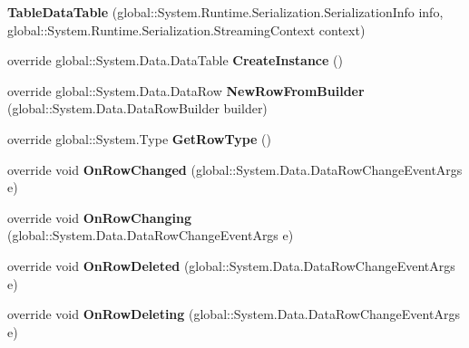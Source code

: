 \begin{DoxyCompactItemize}
\item 
\mbox{\label{classprojekt__grupowy_1_1database_data_set1_1_1_table_data_table_ac0995da5cb120357cb3af240467de6f1}} 
{\bfseries Table\+Data\+Table} (global\+::\+System.\+Runtime.\+Serialization.\+Serialization\+Info info, global\+::\+System.\+Runtime.\+Serialization.\+Streaming\+Context context)
\item 
\mbox{\label{classprojekt__grupowy_1_1database_data_set1_1_1_table_data_table_a4ffd6a51c1c4c0a27c8a012bc6db94a1}} 
override global\+::\+System.\+Data.\+Data\+Table {\bfseries Create\+Instance} ()
\item 
\mbox{\label{classprojekt__grupowy_1_1database_data_set1_1_1_table_data_table_a61b91c7eafce70ab6709152f96f77386}} 
override global\+::\+System.\+Data.\+Data\+Row {\bfseries New\+Row\+From\+Builder} (global\+::\+System.\+Data.\+Data\+Row\+Builder builder)
\item 
\mbox{\label{classprojekt__grupowy_1_1database_data_set1_1_1_table_data_table_a3cbf6074bb047e88fa88f6568589eb32}} 
override global\+::\+System.\+Type {\bfseries Get\+Row\+Type} ()
\item 
\mbox{\label{classprojekt__grupowy_1_1database_data_set1_1_1_table_data_table_aa4281e17997c8b233a81a69fc9261c2c}} 
override void {\bfseries On\+Row\+Changed} (global\+::\+System.\+Data.\+Data\+Row\+Change\+Event\+Args e)
\item 
\mbox{\label{classprojekt__grupowy_1_1database_data_set1_1_1_table_data_table_a02e53176dc2fcbb4a0bf31f99e1a4309}} 
override void {\bfseries On\+Row\+Changing} (global\+::\+System.\+Data.\+Data\+Row\+Change\+Event\+Args e)
\item 
\mbox{\label{classprojekt__grupowy_1_1database_data_set1_1_1_table_data_table_abbe092066f472ddabc2eb44f3ffd666b}} 
override void {\bfseries On\+Row\+Deleted} (global\+::\+System.\+Data.\+Data\+Row\+Change\+Event\+Args e)
\item 
\mbox{\label{classprojekt__grupowy_1_1database_data_set1_1_1_table_data_table_a904da21b62e463d68564943e084165bb}} 
override void {\bfseries On\+Row\+Deleting} (global\+::\+System.\+Data.\+Data\+Row\+Change\+Event\+Args e)
\end{DoxyCompactItemize}
